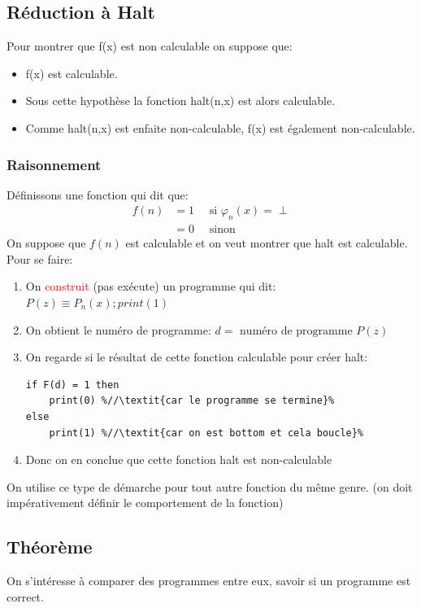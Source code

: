 \documentclass{report}
\begin{document}
\subsection{Réduction à Halt}
Pour montrer que f(x) est non calculable on suppose que:
\begin{itemize}
\item f(x) est calculable.
\item Sous cette hypothèse la fonction halt(n,x) est alors calculable.
\item Comme halt(n,x) est enfaite non-calculable, f(x) est également non-calculable.
\end{itemize}

\subsubsection{Raisonnement}
Définissons une fonction qui dit que:
\begin{align*}
f(n) &= 1 \quad \text{ si } \varphi_n(x) = \perp\\
&= 0 \quad \text{ sinon}
\end{align*}
On suppose que $f(n)$ est calculable et on veut montrer que halt est calculable. Pour se faire:
\begin{enumerate}
\item On \textcolor{red}{construit} (pas exécute) un programme qui dit: $P(z) \equiv P_n(x); print(1)$
\item On obtient le numéro de programme: $d = \text{ numéro de programme } P(z)$
\item On regarde si le résultat de cette fonction calculable pour créer halt:
\begin{lstlisting}[escapechar=\%]
if F(d) = 1 then
	print(0) %//\textit{car le programme se termine}%
else
	print(1) %//\textit{car on est bottom et cela boucle}%
\end{lstlisting}
\item Donc on en conclue que cette fonction halt est non-calculable
\end{enumerate}
On utilise ce type de démarche pour tout autre fonction du même genre. (on doit impérativement définir le comportement de la fonction)

\subsection{Théorème}
On s'intéresse à comparer des programmes entre eux, savoir si un programme est correct.
\end{document}
